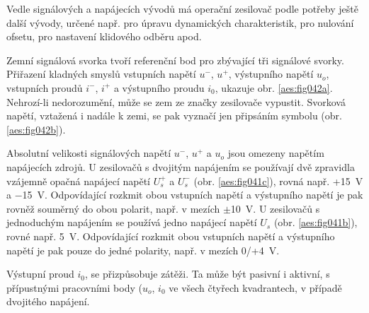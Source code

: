       Vedle signálových a napájecích vývodů má operační zesilovač podle potřeby ještě další vývody,
      určené např. pro úpravu dynamických charakteristik, pro nulování ofsetu, pro nastavení
      klidového odběru apod.

      Zemní signálová svorka tvoří referenční bod pro zbývající tři signálové svorky. Přiřazení
      kladných smyslů vstupních napětí \(u^-\), \(u^+\), výstupního napětí \(u_o\), vstupních proudů
      \(i^-\), \(i^+\) a výstupního proudu \(i_0\), ukazuje obr. \ref{aes:fig042a}. Nehrozí-li
      nedorozumění, může se zem ze značky zesilovače vypustit. Svorková napětí, vztažená i nadále k
      zemi, se pak vyznačí jen připsáním symbolu (obr. \ref{aes:fig042b}).

      Absolutní velikosti signálových napětí \(u^-\), \(u^+\) a \(u_o\) jsou omezeny napětím
      napájecích zdrojů. U zesilovačů s dvojitým napájením se používají dvě zpravidla vzájemně
      opačná napájecí napětí \(U_s^+\) a \(U_s^-\) (obr. \ref{aes:fig041c}), rovná např.
      +\SI{+15}{\volt} a \SI{-15}{\volt}. Odpovídající rozkmit obou vstupních napětí a výstupního
      napětí je pak rovněž souměrný do obou polarit, např. v mezích \(\pm\)\SI{10}{\volt}. U
      zesilovačů s jednoduchým napájením se používá jedno napájecí napětí \(U_s\) (obr.
      \ref{aes:fig041b}), rovné např. \SI{5}{\volt}. Odpovídající rozkmit obou vstupních napětí a
      výstupního napětí je pak pouze do jedné polarity, např. v mezích \num{0}/+\SI{4}{\volt}.

      Výstupní proud \(i_0\), se přizpůsobuje zátěži. Ta může být pasivní i aktivní, s přípustnými
      pracovními body (\(u_o\), \(i_0\) ve všech čtyřech kvadrantech, v případě dvojitého napájení.

